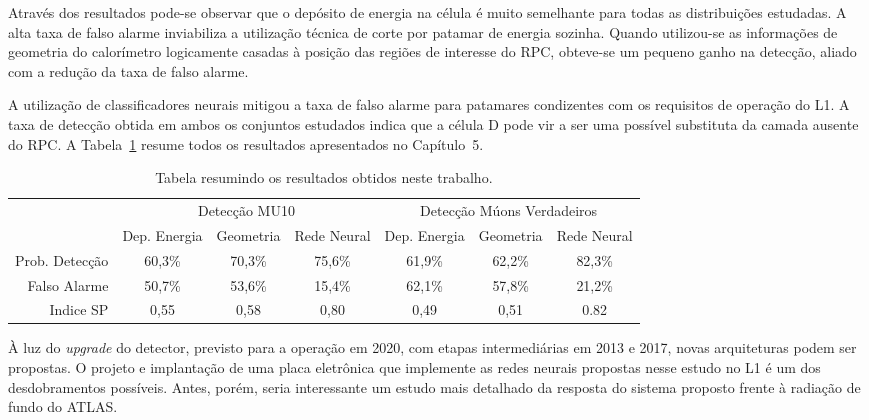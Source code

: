 Através dos resultados pode-se observar que o depósito de energia na célula é
muito semelhante para todas as distribuições estudadas. A alta taxa de falso
alarme inviabiliza a utilização técnica de corte por patamar de energia sozinha.
Quando utilizou-se as informações de geometria do calorímetro logicamente
casadas à posição das regiões de interesse do RPC, obteve-se um pequeno ganho na
detecção, aliado com a redução da taxa de falso alarme.

A utilização de classificadores neurais mitigou a taxa de falso alarme para
patamares condizentes com os requisitos de operação do L1. A taxa de detecção
obtida em ambos os conjuntos estudados indica que a célula D pode vir a ser uma
possível substituta da camada ausente do RPC. A Tabela~\ref{summary}
resume todos os resultados apresentados no Capítulo~5.

\begin{table}[hptp!]\footnotesize
  \centering
  \tabcolsep=0.08cm
  \begin{tabular}{ r c c c c c c }
       \multicolumn{1}{c}{} & \multicolumn{3}{c}{Detecção MU10}& \multicolumn{3}{c}{Detecção Múons Verdadeiros} \\
        \cmidrule(r){2-4}
        \cmidrule(r){5-7}
      & Dep. Energia & Geometria & Rede Neural & Dep. Energia & Geometria & Rede Neural \\
      \midrule
      Prob. Detecção & 60,3\% & 70,3\% & 75,6\% & 61,9\%  & 62,2\% & 82,3\% \\[1.5ex]
      Falso Alarme   & 50,7\% & 53,6\% & 15,4\% & 62,1\%  & 57,8\% & 21,2\% \\[1.5ex]
      Indice SP      & 0,55   & 0,58   & 0,80 & 0,49    & 0,51   & 0.82   \\
      \bottomrule
  \end{tabular}
  \caption{Tabela resumindo os resultados obtidos neste trabalho.}
  \label{summary}
\end{table}



À luz do \emph{upgrade} do detector, previsto para a operação em 2020, com
etapas intermediárias em 2013 e 2017, novas arquiteturas podem ser propostas. O
projeto e implantação de uma placa eletrônica que implemente as redes neurais
propostas nesse estudo no L1 é um dos desdobramentos possíveis. Antes, porém,
seria interessante um estudo mais detalhado da resposta do sistema proposto
frente à radiação de fundo do ATLAS.
